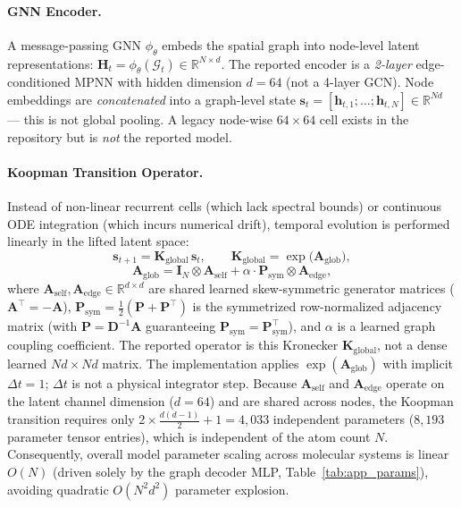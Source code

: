 \documentclass{article}
\newcommand{\K}{\mathbf{K}}
\newcommand{\R}{\mathbb{R}}
\begin{document}
\paragraph{GNN Encoder.}
A message-passing GNN $\phi_\theta$ embeds the spatial graph into node-level latent representations: $\mathbf{H}_t = \phi_\theta(\mathcal{G}_t) \in \R^{N \times d}$. The reported encoder is a \emph{2-layer} edge-conditioned MPNN with hidden dimension $d=64$ (not a 4-layer GCN). Node embeddings are \emph{concatenated} into a graph-level state $\mathbf{s}_t = [\mathbf{h}_{t,1}; \dots; \mathbf{h}_{t,N}] \in \R^{Nd}$ --- this is not global pooling. A legacy node-wise $64\times 64$ cell exists in the repository but is \emph{not} the reported model.

\paragraph{Koopman Transition Operator.}
Instead of non-linear recurrent cells (which lack spectral bounds) or continuous ODE integration (which incurs numerical drift), temporal evolution is performed linearly in the lifted latent space:
\begin{equation}
  \label{eq:koopman_step}
  \mathbf{s}_{t+1} = \K_{\text{global}}\,\mathbf{s}_t, \qquad
  \K_{\text{global}} = \exp\!\bigl(\mathbf{A}_{\text{glob}}\bigr),
\end{equation}
\begin{equation}
  \label{eq:koopman_kron}
  \mathbf{A}_{\text{glob}} = \mathbf{I}_N \otimes \mathbf{A}_{\text{self}} + \alpha \cdot \mathbf{P}_{\text{sym}} \otimes \mathbf{A}_{\text{edge}},
\end{equation}
where $\mathbf{A}_{\text{self}}, \mathbf{A}_{\text{edge}} \in \R^{d \times d}$ are shared learned skew-symmetric generator matrices ($\mathbf{A}^\top = -\mathbf{A}$), $\mathbf{P}_{\text{sym}} = \frac{1}{2}(\mathbf{P} + \mathbf{P}^\top)$ is the symmetrized row-normalized adjacency matrix (with $\mathbf{P} = \mathbf{D}^{-1}\mathbf{A}$ guaranteeing $\mathbf{P}_{\text{sym}} = \mathbf{P}_{\text{sym}}^\top$), and $\alpha$ is a learned graph coupling coefficient. The reported operator is this Kronecker $\K_{\text{global}}$, not a dense learned $Nd\times Nd$ matrix. The implementation applies $\exp(\mathbf{A}_{\text{glob}})$ with implicit $\Delta t = 1$; $\Delta t$ is not a physical integrator step. Because $\mathbf{A}_{\text{self}}$ and $\mathbf{A}_{\text{edge}}$ operate on the latent channel dimension ($d=64$) and are shared across nodes, the Koopman transition requires only $2 \times \frac{d(d-1)}{2} + 1 = 4,033$ independent parameters ($8,193$ parameter tensor entries), which is independent of the atom count $N$. Consequently, overall model parameter scaling across molecular systems is linear $O(N)$ (driven solely by the graph decoder MLP, Table~\ref{tab:app_params}), avoiding quadratic $O(N^2 d^2)$ parameter explosion.
\end{document}
